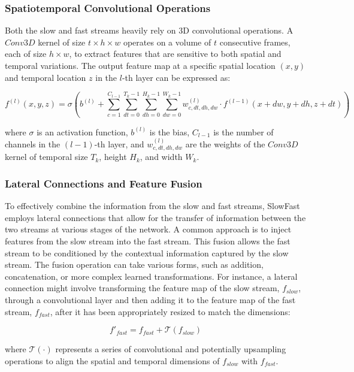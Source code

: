 \subsubsection{Spatiotemporal Convolutional Operations}

Both the slow and fast streams heavily rely on 3D convolutional operations. A $Conv3D$ kernel of size $t \times h \times w$ operates on a volume of $t$ consecutive frames, each of size $h \times w$, to extract features that are sensitive to both spatial and temporal variations. The output feature map at a specific spatial location $(x, y)$ and temporal location $z$ in the $l$-th layer can be expressed as:

$$
f^{(l)}(x, y, z) = \sigma \left( b^{(l)} + \sum_{c=1}^{C_{l-1}} \sum_{dt=0}^{T_k-1} \sum_{dh=0}^{H_k-1} \sum_{dw=0}^{W_k-1} w^{(l)}_{c, dt, dh, dw} \cdot f^{(l-1)}(x+dw, y+dh, z+dt) \right)
$$

where $\sigma$ is an activation function, $b^{(l)}$ is the bias, $C_{l-1}$ is the number of channels in the $(l-1)$-th layer, and $w^{(l)}_{c, dt, dh, dw}$ are the weights of the $Conv3D$ kernel of temporal size $T_k$, height $H_k$, and width $W_k$.

\subsubsection{Lateral Connections and Feature Fusion}

To effectively combine the information from the slow and fast streams, SlowFast employs lateral connections that allow for the transfer of information between the two streams at various stages of the network. A common approach is to inject features from the slow stream into the fast stream. This fusion allows the fast stream to be conditioned by the contextual information captured by the slow stream. The fusion operation can take various forms, such as addition, concatenation, or more complex learned transformations. For instance, a lateral connection might involve transforming the feature map of the slow stream, $f_{slow}$, through a convolutional layer and then adding it to the feature map of the fast stream, $f_{fast}$, after it has been appropriately resized to match the dimensions:

$$
f'_{fast} = f_{fast} + \mathcal{T}(f_{slow})
$$

where $\mathcal{T}(\cdot)$ represents a series of convolutional and potentially upsampling operations to align the spatial and temporal dimensions of $f_{slow}$ with $f_{fast}$.


